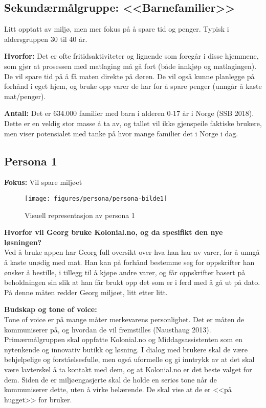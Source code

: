 \subsection{\textbf{Sekundærmålgruppe: <<Barnefamilier>>}}
 Litt opptatt av miljø, men mer fokus på å spare tid og penger. Typisk i aldersgruppen 30 til 40 år.

\textbf{Hvorfor:} Det er ofte fritidsaktiviteter og lignende som foregår i disse hjemmene, som gjør at prosessen med matlaging må gå fort (både innkjøp og matlagingen). De vil spare tid på å få maten direkte på døren. De vil også kunne planlegge på forhånd i eget hjem, og bruke opp varer de har for å spare penger (unngår å kaste mat/penger).  

\textbf{Antall:} Det er 634.000 familier med barn i alderen 0-17 år i Norge (SSB 2018). Dette er en veldig stor masse å ta av, og tallet vil ikke gjenspeile faktiske brukere, men viser potensialet med tanke på hvor mange familier det i Norge i dag. 

\subsection{\textbf{Persona 1}}
\textbf{Fokus:} Vil spare miljøet

\begin{figure}[!h] 
    \centering
    \texttt{[image: figures/persona/persona-bilde1]}
    \caption[Persona 1]{Visuell representasjon av persona 1
    \label{fig:persona1}}
\end{figure}

\textbf{Hvorfor vil Georg bruke Kolonial.no, og da spesifikt den nye løsningen?} 
\\Ved å bruke appen har Georg full oversikt over hva han har av varer, for å unngå å kaste unødig med mat. Han kan på forhånd bestemme seg for oppskrifter han ønsker å bestille, i tillegg til å kjøpe andre varer, og får oppskrifter basert på beholdningen sin slik at han får brukt opp det som er i ferd med å gå ut på dato. På denne måten redder Georg miljøet, litt etter litt.

\textbf{Budskap og tone of voice:}
\\Tone of voice er på mange måter merkevarens personlighet. Det er måten de kommuniserer på, og hvordan de vil fremstilles (Nausthaug 2013). Primærmålgruppen skal oppfatte Kolonial.no og Middagsassistenten som en nytenkende og innovativ butikk og løsning. I dialog med brukere skal de være behjelpelige og forståelsesfulle, men også uformelle og gi inntrykk av at det skal være lavterskel å ta kontakt med dem, og at Kolonial.no er det beste valget for dem. Siden de er miljøengasjerte skal de holde en seriøs tone når de kommuniserer dette, uten å virke belærende. De skal vise at de er <<på hugget>> for bruker.


